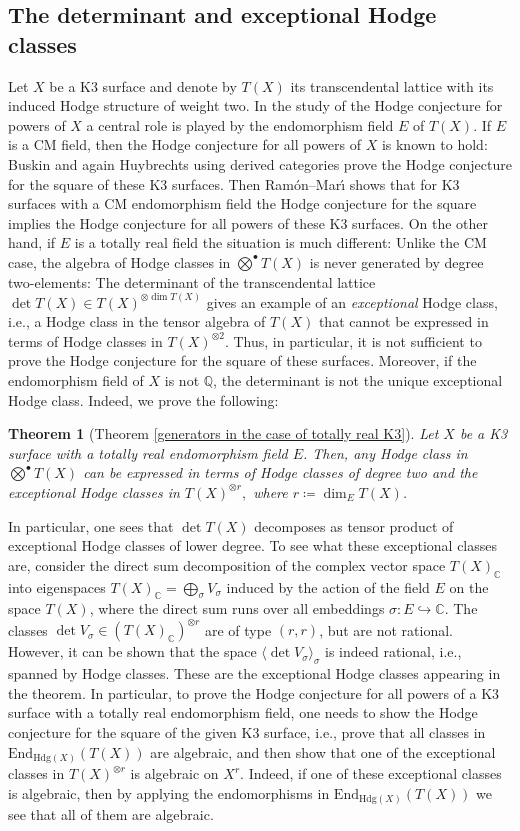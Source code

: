 \documentclass[11pt,twoside,a4paper]{amsart}
\newcommand{\0}{\mathscr{O}}
\newcommand{\Q}{\mathbb{Q}}
\newcommand{\C}{\mathbb{C}}
\newcommand{\s}{\sigma}
\theoremstyle{plain}
\newtheorem{thm}{Theorem}[section]
\theoremstyle{definition}
\theoremstyle{remark}
\begin{document}
\subsection{The determinant and exceptional Hodge classes}
Let $X$ be a K3 surface and denote by $T(X)$ its transcendental lattice with its induced Hodge structure of weight two. In the study of the Hodge conjecture for powers of $X$ a central role is played by the endomorphism field $E$ of $T(X)$. If $E$ is a CM field, then the Hodge conjecture for all powers of $X$ is known to hold: Buskin \cite{buskin2019every} and again Huybrechts \cite{huybrechts2019motives} using derived categories prove the Hodge conjecture for the square of these K3 surfaces. Then Ram{\'o}n--Mar{\'\i} \cite{mari2008hodge} shows that for K3 surfaces with a CM endomorphism field the Hodge conjecture for the square implies the Hodge conjecture for all powers of these K3 surfaces. On the other hand, if $E$ is a totally real field the situation is much different: Unlike the CM case, the algebra of Hodge classes in $\bigotimes^\bullet T(X)$ is never generated by degree two-elements: The determinant of the transcendental lattice $\det T(X)\in T(X)^{\otimes \dim T(X)}$ gives an example of an \textit{exceptional} Hodge class, i.e., a Hodge class in the tensor algebra of $T(X)$ that cannot be expressed in terms of Hodge classes in $T(X)^{\otimes 2}$. Thus, in particular, it is not sufficient to prove the Hodge conjecture for the square of these surfaces. Moreover, if the endomorphism field of $X$ is not $\Q$, the determinant is not the unique exceptional Hodge class. Indeed, we prove the following:
\begin{thm}[Theorem \ref{generators in the case of totally real K3}]
Let $X$ be a K3 surface with a totally real endomorphism field $E$. Then, any Hodge class in $\bigotimes^{\bullet}T(X)$ can be expressed in terms of Hodge classes of degree two and the exceptional Hodge classes in $T(X)^{\otimes r},$ where $r\coloneqq \dim_E T(X)$.
\end{thm}
In particular, one sees that $\det T(X)$ decomposes as tensor product of exceptional Hodge classes of lower degree. To see what these exceptional classes are, consider the direct sum decomposition of the complex vector space $T(X)_\C$ into eigenspaces $T(X)_\C=\bigoplus_\s V_\s$ induced by the action of the field $E$ on the space $T(X)$, where the direct sum runs over all embeddings $\sigma\colon E \hookrightarrow \C$. The classes $\det V_\sigma\in (T(X)_\C)^{\otimes r}$ are of type $(r,r)$, but are not rational. However, it can be shown that the space
$\langle \det V_\s\rangle_{\s}$ is indeed rational, i.e., spanned by Hodge classes. These are the exceptional Hodge classes appearing in the theorem. In particular, to prove the Hodge conjecture for all powers of a K3 surface with a totally real endomorphism field, one needs to show the Hodge conjecture for the square of the given K3 surface, i.e., prove that all classes in $\mathrm{End}_{\mathrm{Hdg}(X)}(T(X))$ are algebraic, and then show that one of the exceptional classes in $T(X)^{\otimes r}$ is algebraic on $X^r$. Indeed, if one of these exceptional classes is algebraic, then by applying the endomorphisms in $\mathrm{End}_{\mathrm{Hdg}(X)}(T(X))$ we see that all of them are algebraic.
\end{document}
